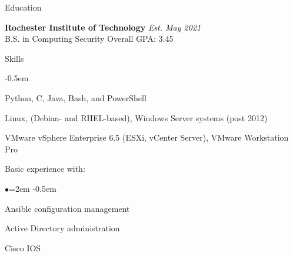 \documentclass{resume} %
\begin{document}

\begin{rSection}{Education}

{\bf Rochester Institute of Technology} \hfill {\em Est. May 2021} \\ 
B.S. in Computing Security \hfill Overall GPA: 3.45

\end{rSection}


\begin{rSection}{Skills}
    \begin{description}
        \itemsep -0.5em
        \item[Programming] Python, C, Java, Bash, and PowerShell
        \item[Operating Systems] Linux, (Debian- and RHEL-based), Windows
            Server systems (post 2012)
        \item[Virtualization] VMware vSphere Enterprise 6.5 (ESXi, vCenter
            Server), VMware Workstation Pro
    \end{description}
    Basic experience with:
    \begin{list}{$\bullet$}{\leftmargin=2em}
    \itemsep -0.5em \vspace{-0.5em}
    \item Ansible configuration management
    \item Active Directory administration
    \item Cisco IOS
    \end{list}

\end{rSection}

\end{document}
